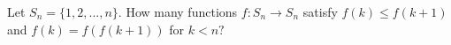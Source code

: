 Let $S_{n}=\{1,2,...,n\}$. How many functions $f:S_{n} \rightarrow S_{n}$ satisfy $f(k) \leq f(k+1)$ and $f(k)=f(f(k+1))$ for $k <n?$